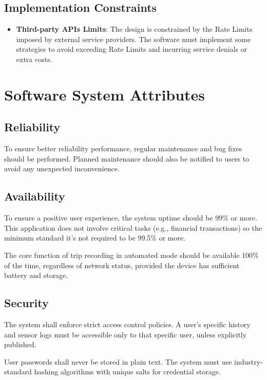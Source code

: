 \subsection{Implementation Constraints}

\begin{itemize}
    \item \textbf{Third-party APIs Limits}: The design is constrained by the Rate Limits imposed by external service providers. The software must implement some strategies to avoid exceeding Rate Limits and incurring service denials or extra costs.
\end{itemize}

\section{Software System Attributes}
\label{sec:attributes}

\subsection{Reliability}

To ensure better reliability performance, regular maintenance and bug fixes should be performed. Planned maintenance should also be notified to users to avoid any unexpected inconvenience.

\subsection{Availability}

To ensure a positive user experience, the system uptime should be 99\% or more. This application does not involve critical tasks (e.g., financial transactions) so the minimum standard it's not required to be 99.5\% or more.

The core function of trip recording in automated mode should be available 100\% of the time, regardless of network status, provided the device has sufficient battery and storage.

\subsection{Security}

The system shall enforce strict access control policies. A user's specific history and sensor logs must be accessible only to that specific user, unless explicitly published.

User passwords shall never be stored in plain text. The system must use industry-standard hashing algorithms with unique salts for credential storage.

